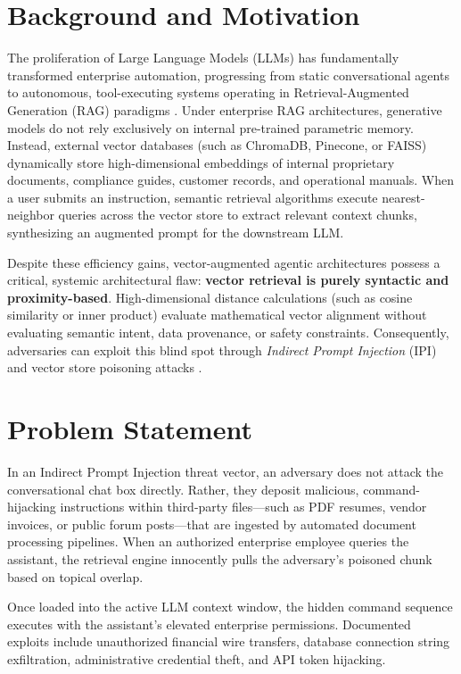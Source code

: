 \label{chap:intro}
\section{Background and Motivation}
The proliferation of Large Language Models (LLMs) has fundamentally transformed enterprise automation, progressing from static conversational agents to autonomous, tool-executing systems operating in Retrieval-Augmented Generation (RAG) paradigms \cite{lewis2020retrieval}. Under enterprise RAG architectures, generative models do not rely exclusively on internal pre-trained parametric memory. Instead, external vector databases (such as ChromaDB, Pinecone, or FAISS) dynamically store high-dimensional embeddings of internal proprietary documents, compliance guides, customer records, and operational manuals. When a user submits an instruction, semantic retrieval algorithms execute nearest-neighbor queries across the vector store to extract relevant context chunks, synthesizing an augmented prompt for the downstream LLM.

Despite these efficiency gains, vector-augmented agentic architectures possess a critical, systemic architectural flaw: \textbf{vector retrieval is purely syntactic and proximity-based}. High-dimensional distance calculations (such as cosine similarity or inner product) evaluate mathematical vector alignment without evaluating semantic intent, data provenance, or safety constraints. Consequently, adversaries can exploit this blind spot through \textit{Indirect Prompt Injection} (IPI) and vector store poisoning attacks \cite{zou2025poisonedrag, greshake2023not}.

\section{Problem Statement}
In an Indirect Prompt Injection threat vector, an adversary does not attack the conversational chat box directly. Rather, they deposit malicious, command-hijacking instructions within third-party files—such as PDF resumes, vendor invoices, or public forum posts—that are ingested by automated document processing pipelines. When an authorized enterprise employee queries the assistant, the retrieval engine innocently pulls the adversary's poisoned chunk based on topical overlap. 

Once loaded into the active LLM context window, the hidden command sequence executes with the assistant's elevated enterprise permissions. Documented exploits include unauthorized financial wire transfers, database connection string exfiltration, administrative credential theft, and API token hijacking.

